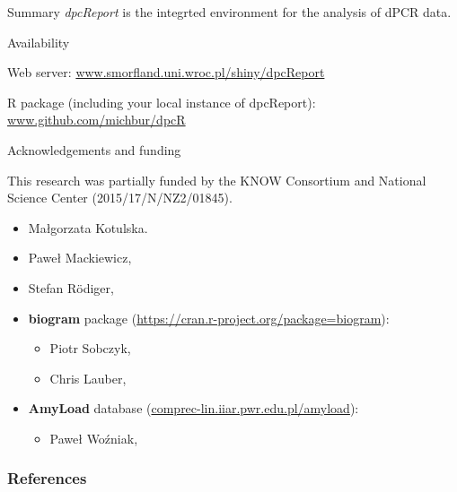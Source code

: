 \documentclass{beamer}\usepackage[]{graphicx}\usepackage[]{color}
\begin{document}
\begin{frame}{Summary}
\textit{dpcReport} is the integrted environment for the analysis of dPCR data.
\end{frame}


\begin{frame}{Availability}

Web server:
\url{www.smorfland.uni.wroc.pl/shiny/dpcReport}

R package (including your local instance of dpcReport):
\url{www.github.com/michbur/dpcR}

\end{frame}

\begin{frame}{Acknowledgements and funding}

This research was partially funded by the KNOW Consortium and National Science Center (2015/17/N/NZ2/01845).

\small{
\begin{itemize}
\item Małgorzata Kotulska.
\item Paweł Mackiewicz,
\item Stefan R\"{o}diger,
\item \textbf{biogram} package (\url{https://cran.r-project.org/package=biogram}):
\begin{itemize}
\small
\item Piotr Sobczyk,
\item Chris Lauber,
\end{itemize}

\item \textbf{AmyLoad} database (\url{comprec-lin.iiar.pwr.edu.pl/amyload}):
\begin{itemize}
\small
\item Paweł Woźniak,
\end{itemize}
\end{itemize}
}

\end{frame}



\begin{frame}[allowframebreaks]
        \frametitle{References}
  
  
\end{frame}  
\end{document}
